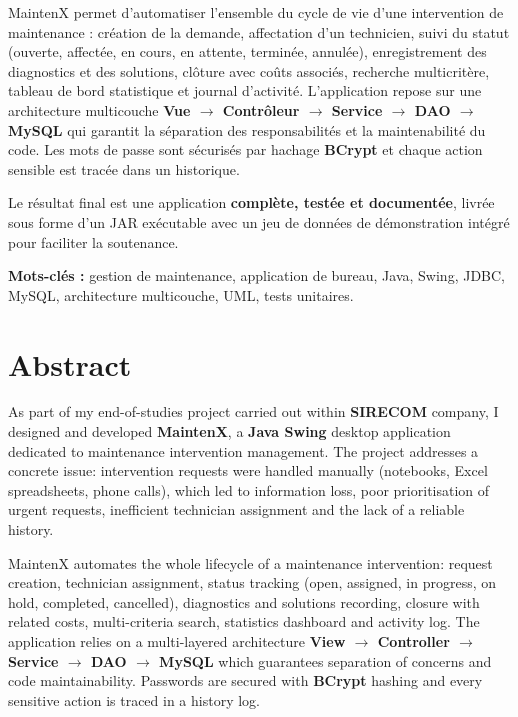 \documentclass[11pt,a4paper]{report}
\begin{document}
MaintenX permet d'automatiser l'ensemble du cycle de vie d'une intervention de maintenance : création de la demande, affectation d'un technicien, suivi du statut (ouverte, affectée, en cours, en attente, terminée, annulée), enregistrement des diagnostics et des solutions, clôture avec coûts associés, recherche multicritère, tableau de bord statistique et journal d'activité. L'application repose sur une architecture multicouche \textbf{Vue $\rightarrow$ Contrôleur $\rightarrow$ Service $\rightarrow$ DAO $\rightarrow$ MySQL} qui garantit la séparation des responsabilités et la maintenabilité du code. Les mots de passe sont sécurisés par hachage \textbf{BCrypt} et chaque action sensible est tracée dans un historique.

Le résultat final est une application \textbf{complète, testée et documentée}, livrée sous forme d'un JAR exécutable avec un jeu de données de démonstration intégré pour faciliter la soutenance.

\textbf{Mots-clés :} gestion de maintenance, application de bureau, Java, Swing, JDBC, MySQL, architecture multicouche, UML, tests unitaires.
\chapter*{Abstract}

As part of my end-of-studies project carried out within \textbf{SIRECOM} company, I designed and developed \textbf{MaintenX}, a \textbf{Java Swing} desktop application dedicated to maintenance intervention management. The project addresses a concrete issue: intervention requests were handled manually (notebooks, Excel spreadsheets, phone calls), which led to information loss, poor prioritisation of urgent requests, inefficient technician assignment and the lack of a reliable history.

MaintenX automates the whole lifecycle of a maintenance intervention: request creation, technician assignment, status tracking (open, assigned, in progress, on hold, completed, cancelled), diagnostics and solutions recording, closure with related costs, multi-criteria search, statistics dashboard and activity log. The application relies on a multi-layered architecture \textbf{View $\rightarrow$ Controller $\rightarrow$ Service $\rightarrow$ DAO $\rightarrow$ MySQL} which guarantees separation of concerns and code maintainability. Passwords are secured with \textbf{BCrypt} hashing and every sensitive action is traced in a history log.
\end{document}
